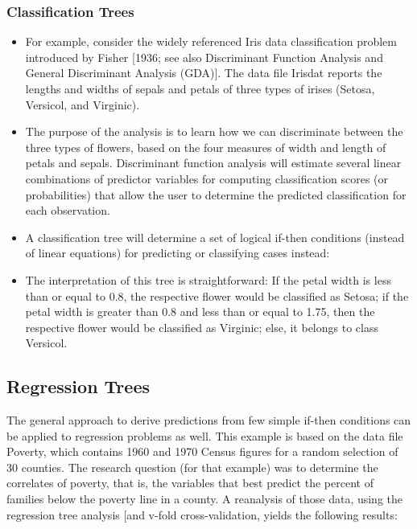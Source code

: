 \documentclass[caret-main.tex]{subfiles}
\begin{document}
\subsubsection{Classification Trees}
\begin{itemize}
\item For example, consider the widely referenced Iris data classification problem introduced by Fisher [1936; see also Discriminant Function Analysis and General Discriminant Analysis (GDA)]. The data file Irisdat reports the lengths and widths of sepals and petals of three types of irises (Setosa, Versicol, and Virginic). 
\item The purpose of the analysis is to learn how we can discriminate between the three types of flowers, based on the four measures of width and length of petals and sepals. Discriminant function analysis will estimate several linear combinations of predictor variables for computing classification scores (or probabilities) that allow the user to determine the predicted classification for each observation. 
\item A classification tree will determine a set of logical if-then conditions (instead of linear equations) for predicting or classifying cases instead:

\item The interpretation of this tree is straightforward: If the petal width is less than or equal to 0.8, the respective flower would be classified as Setosa; if the petal width is greater than 0.8 and less than or equal to 1.75, then the respective flower would be classified as Virginic; else, it belongs to class Versicol.
\end{itemize}
\subsection{Regression Trees}

The general approach to derive predictions from few simple if-then conditions can be applied to regression problems as well. This example is based on the data file Poverty, which contains 1960 and 1970 Census figures for a random selection of 30 counties. The research question (for that example) was to determine the correlates of poverty, that is, the variables that best predict the percent of families below the poverty line in a county. A reanalysis of those data, using the regression tree analysis [and v-fold cross-validation, yields the following results:
\end{document}
